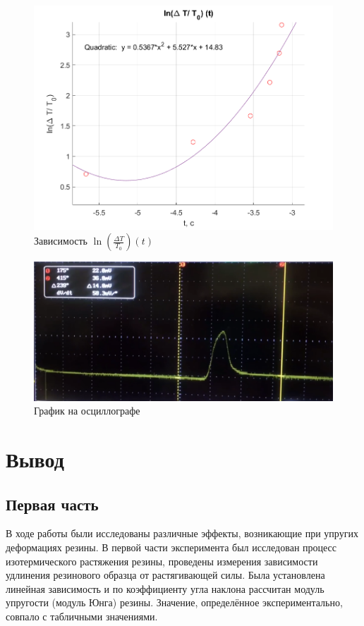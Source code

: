 \documentclass[a4paper,11.5pt]{article} %
\begin{document}
\begin{figure}[h!]
    \centering
    \includegraphics[scale=0.59]{graph4.png}
    \caption{Зависимость $\ln(\frac{\Delta T}{T_0}) (t)$}
    \label{fig:vac24}
\end{figure}

\begin{figure}[h!]
    \centering
    \includegraphics[scale=0.35]{graph3.png}
    \caption{График на осциллографе}
    \label{fig:vac23}
\end{figure}

\newpage
 
\section{Вывод}

\subsection{Первая часть}
 В ходе работы были исследованы различные эффекты, возникающие при упругих деформациях резины. В первой части эксперимента был исследован процесс изотермического растяжения резины, проведены измерения зависимости удлинения резинового образца от растягивающей силы. Была установлена линейная зависимость и по коэффициенту угла наклона рассчитан модуль упругости (модуль Юнга) резины. Значение, определённое экспериментально, совпало с табличными значениями.
\end{document}
